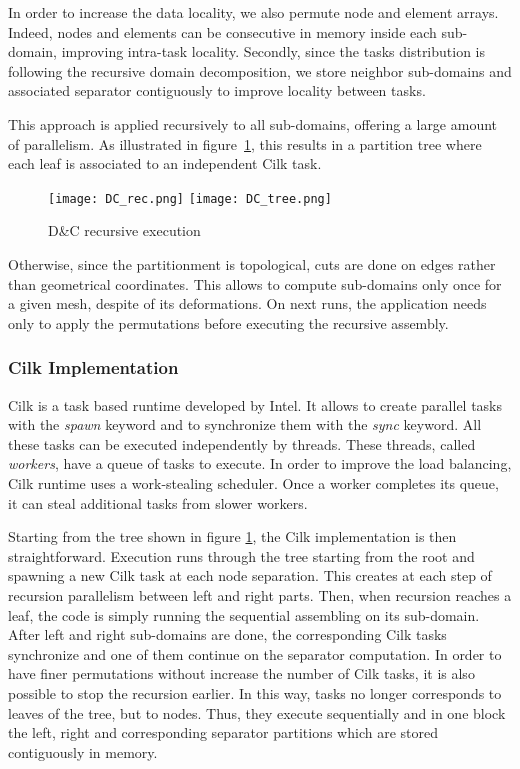\documentclass{IOS-Book-Article}
\begin{document}
In order to increase the data locality, we also permute node and element arrays.
Indeed, nodes and elements can be consecutive in memory inside each sub-domain, improving intra-task locality.
Secondly, since the tasks distribution is following the recursive domain decomposition, we store neighbor sub-domains and associated separator contiguously to improve locality between tasks.

This approach is applied recursively to all sub-domains, offering a large amount of parallelism.
As illustrated in figure~\ref{fig:DCexe}, this results in a partition tree where each leaf is associated to an independent Cilk task.
\begin{figure}[htp]
 \centering
 \texttt{[image: DC\_rec.png]}
 \texttt{[image: DC\_tree.png]}
 \caption{D\&C recursive execution}
 \label{fig:DCexe}
\end{figure}

Otherwise, since the partitionment is topological, cuts are done on edges rather than geometrical coordinates.
This allows to compute sub-domains only once for a given mesh, despite of its deformations.
On next runs, the application needs only to apply the permutations before executing the recursive assembly.

\subsubsection{Cilk Implementation}
Cilk is a task based runtime developed by Intel. It allows to create parallel tasks with the \emph{spawn} keyword and to synchronize them with the \emph{sync} keyword.
All these tasks can be executed independently by threads. These threads, called \emph{workers}, have a queue of tasks to execute.
In order to improve the load balancing, Cilk runtime uses a work-stealing scheduler. Once a worker completes its queue, it can steal additional tasks from slower workers.

Starting from the tree shown in figure \ref{fig:DCexe}, the Cilk implementation is then straightforward.
Execution runs through the tree starting from the root and spawning a new Cilk task at each node separation.
This creates at each step of recursion parallelism between left and right parts.
Then, when recursion reaches a leaf, the code is simply running the sequential assembling on its sub-domain.
After left and right sub-domains are done, the corresponding Cilk tasks synchronize and one of them continue on the separator computation.
In order to have finer permutations without increase the number of Cilk tasks, it is also possible to stop the recursion earlier.
In this way, tasks no longer corresponds to leaves of the tree, but to nodes.
Thus, they execute sequentially and in one block the left, right and corresponding separator partitions which are stored contiguously in memory.
\end{document}

